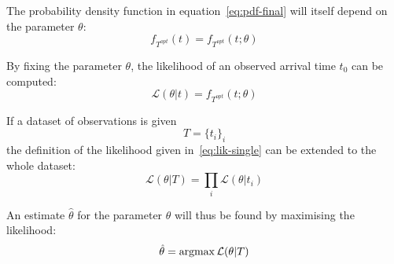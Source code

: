 The probability density function in equation~\eqref{eq:pdf-final} will itself depend on the parameter \(\theta\):
\begin{equation*}
  f_{T^{opt}}(t) = f_{T^{opt}}(t; \theta)
\end{equation*}

By fixing the parameter \(\theta\),
the likelihood of an observed arrival time \(t_0\) can be computed:
\begin{equation}
  \label{eq:lik-single}
  \mathcal{L}(\theta | t) = f_{T^{opt}}(t; \theta)
\end{equation}

If a dataset of observations is given
\begin{equation*}
  T = \{t_i\}_i
\end{equation*}
the definition of the likelihood given in~\eqref{eq:lik-single} can be extended to the whole dataset:
\begin{equation}
  \label{eq:lik-final}
  \mathcal{L}(\theta | T) = \prod_i \mathcal{L}(\theta | t_i)
\end{equation}

An estimate \(\hat{\theta}\) for the parameter \(\theta\) will thus be found by maximising the likelihood:
\begin{equation}
  \label{eq:max-lik}
  \hat{\theta} = \operatorname*{argmax} \mathcal{L}(\theta | T)
\end{equation}

